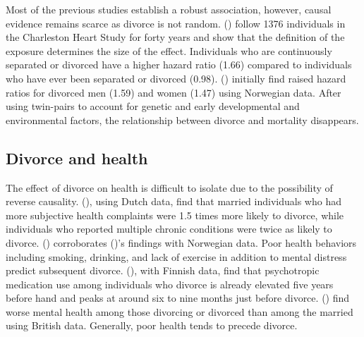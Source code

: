 \documentclass[a4paper,12pt]{article}
\theoremstyle{plain}
\theoremstyle{definition}
\theoremstyle{TheoremNum}
\theoremstyle{CorollaryNum}
\theoremstyle{PropositionNum}
\theoremstyle{TheoremNum}
\begin{document}
Most of the previous studies establish a robust association, however, causal evidence remains scarce as divorce is not random. \citeauthor{sbarra2009divorce} (\citeyear{sbarra2009divorce}) follow 1376 individuals in the Charleston Heart Study for forty years and show that the definition of the exposure determines the size of the effect. Individuals who are continuously separated or divorced have a higher hazard ratio (1.66) compared to individuals who have ever been separated or divorced (0.98). \citeauthor{wiborg2025partnership} (\citeyear{wiborg2025partnership}) initially find raised hazard ratios for divorced men (1.59) and women (1.47) using Norwegian data. After using twin-pairs to account for genetic and early developmental and environmental factors, the relationship between divorce and mortality disappears.

\subsection{Divorce and health}

The effect of divorce on health is difficult to isolate due to the possibility of reverse causality. \citeauthor*{joung1998longitudinal} (\citeyear{joung1998longitudinal}), using Dutch data, find that married individuals who had more subjective health complaints were 1.5 times more likely to divorce, while individuals who reported multiple chronic conditions were twice as likely to divorce. \citeauthor{torvik2015health} (\citeyear{torvik2015health}) corroborates \citeauthor*{joung1998longitudinal} (\citeyear{joung1998longitudinal})'s findings with Norwegian data. Poor health behaviors including smoking, drinking, and lack of exercise in addition to mental distress predict subsequent divorce. \citeauthor{metsa2013divorce} (\citeyear{metsa2013divorce}), with Finnish data, find that psychotropic medication use among individuals who divorce is already elevated five years before hand and peaks at around six to nine months just before divorce. \citeauthor{wade2004marital} (\citeyear{wade2004marital}) find worse mental health among those divorcing or divorced than among the married using British data. Generally, poor health tends to precede divorce.
\end{document}
